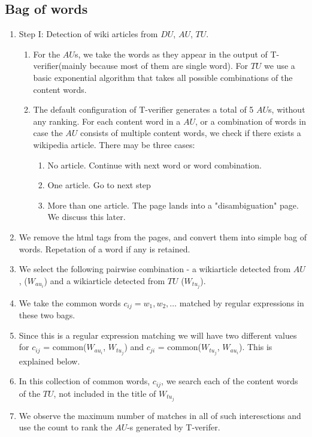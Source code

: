 \documentclass[11pt]{article}
\begin{document}
\subsection{Bag of words}
\begin{enumerate}
\item Step I: Detection of wiki articles from $DU$, $AU$, $TU$.
\begin {enumerate}
\item For the $AU$s, we take the words as they appear in the output of T-verifier(mainly because most of them are single word). For $TU$ we use a basic exponential algorithm that takes all possible combinations of the content words.
\item The default configuration of T-verifier generates a total of 5 $AU$s, without any ranking.  For each content word in a $AU$, or a combination of words in case the $AU$ consists of multiple content words, we check if there exists a wikipedia article. There may be three cases:
\begin{enumerate}
\item No article. Continue with next word or word combination. 
\item One article. Go to next step
\item More than one article. The page lands into a "disambiguation" page. We discuss this later. 
\end{enumerate}
\end{enumerate}
\item We remove the html tags from the pages, and convert them into simple bag of words. Repetation of a word if any is retained.
\item We select the following pairwise combination - a wikiarticle detected from $AU$, ($W_{au_{i}}$) and a wikiarticle detected from $TU$ ($W_{tu_{j}}$).
\item We take the common words $c_{ij} = {w_{1}, w_{2}, \ldots}$ matched by regular expressions in these two bags.
\item Since this is a regular expression matching we will have two different values for $c_{ij}$ = common($W_{au_{i}}$, $W_{tu_{j}}$) and $c_{ji}$ = common($W_{tu_{j}}$, $W_{au_{i}}$). This is explained below.
\item In this collection of common words, $c_{ij}$, we search each of the content words of the $TU$, not included in the title of $W_{tu_{j}}$ 
\item We observe the maximum number of matches in all of such interesctions and use the count to rank the $AU$-s generated by T-verifer. 
\end{enumerate}
\end{document}
